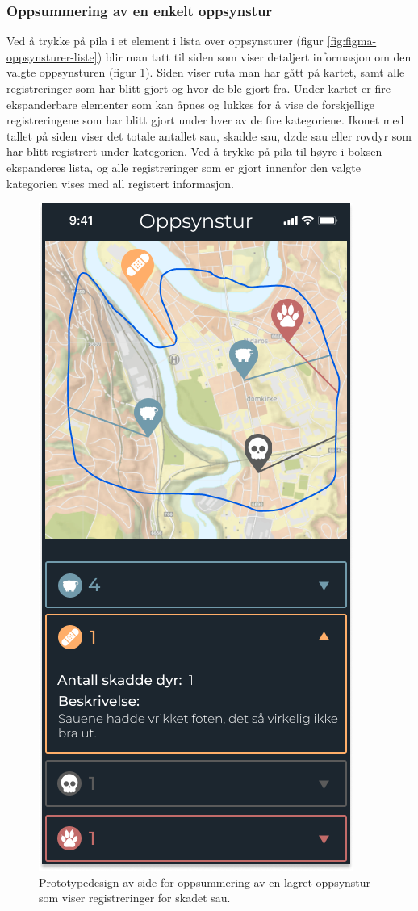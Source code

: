\subsubsection{Oppsummering av en enkelt oppsynstur}
Ved å trykke på pila i et element i lista over oppsynsturer (figur \ref{fig:figma-oppsynsturer-liste}) blir man tatt til siden som viser detaljert informasjon om den valgte oppsynsturen (figur \ref{fig:figma-lagret-oppsynstur}). Siden viser ruta man har gått på kartet, samt alle registreringer som har blitt gjort og hvor de ble gjort fra. Under kartet er fire ekspanderbare elementer som kan åpnes og lukkes for å vise de forskjellige registreringene som har blitt gjort under hver av de fire kategoriene. Ikonet med tallet på siden viser det totale antallet sau, skadde sau, døde sau eller rovdyr som har blitt registrert under kategorien. Ved å trykke på pila til høyre i boksen ekspanderes lista, og alle registreringer som er gjort innenfor den valgte kategorien vises med all registert informasjon.
\begin{figure}[H]
\centering
\captionsetup{width=.8\linewidth}
\includegraphics[scale=0.4]{Figurer/Figma/Frame 7 - Oppsynstur-oppsummering.png}
\caption{Prototypedesign av side for oppsummering av en lagret oppsynstur som viser registreringer for skadet sau.}
\label{fig:figma-lagret-oppsynstur}
\end{figure}
